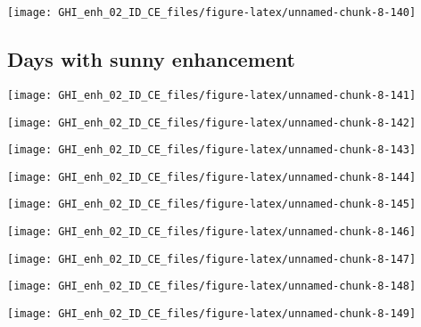 \documentclass[
  10pt,
  a4paper,oneside]{article}
\begin{document}
\begin{center}\texttt{[image: GHI\_enh\_02\_ID\_CE\_files/figure-latex/unnamed-chunk-8-140]} \end{center}

\FloatBarrier

\hypertarget{days-with-sunny-enhancement}{%
\subsection{Days with sunny enhancement}\label{days-with-sunny-enhancement}}

\begin{center}\texttt{[image: GHI\_enh\_02\_ID\_CE\_files/figure-latex/unnamed-chunk-8-141]} \end{center}

\begin{center}\texttt{[image: GHI\_enh\_02\_ID\_CE\_files/figure-latex/unnamed-chunk-8-142]} \end{center}

\begin{center}\texttt{[image: GHI\_enh\_02\_ID\_CE\_files/figure-latex/unnamed-chunk-8-143]} \end{center}

\begin{center}\texttt{[image: GHI\_enh\_02\_ID\_CE\_files/figure-latex/unnamed-chunk-8-144]} \end{center}

\begin{center}\texttt{[image: GHI\_enh\_02\_ID\_CE\_files/figure-latex/unnamed-chunk-8-145]} \end{center}

\begin{center}\texttt{[image: GHI\_enh\_02\_ID\_CE\_files/figure-latex/unnamed-chunk-8-146]} \end{center}

\begin{center}\texttt{[image: GHI\_enh\_02\_ID\_CE\_files/figure-latex/unnamed-chunk-8-147]} \end{center}

\begin{center}\texttt{[image: GHI\_enh\_02\_ID\_CE\_files/figure-latex/unnamed-chunk-8-148]} \end{center}

\begin{center}\texttt{[image: GHI\_enh\_02\_ID\_CE\_files/figure-latex/unnamed-chunk-8-149]} \end{center}
\end{document}
